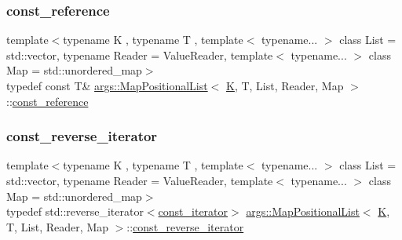 \subsubsection{\texorpdfstring{const\+\_\+reference}{const\_reference}}
{\footnotesize\ttfamily template$<$typename K , typename T , template$<$ typename... $>$ class List = std\+::vector, typename Reader  = Value\+Reader, template$<$ typename... $>$ class Map = std\+::unordered\+\_\+map$>$ \\
typedef const T\& \hyperlink{classargs_1_1_map_positional_list}{args\+::\+Map\+Positional\+List}$<$ \hyperlink{cgal__test_8cpp_a891e241aa245ae63618f03737efba309}{K}, T, List, Reader, Map $>$\+::\hyperlink{classargs_1_1_map_positional_list_a49c2fa40c50f8d1c4f3ef6023761972d}{const\+\_\+reference}}

\mbox{\label{classargs_1_1_map_positional_list_a89cd057f52f097ccd3d3072f62eacd47}} 
\subsubsection{\texorpdfstring{const\+\_\+reverse\+\_\+iterator}{const\_reverse\_iterator}}
{\footnotesize\ttfamily template$<$typename K , typename T , template$<$ typename... $>$ class List = std\+::vector, typename Reader  = Value\+Reader, template$<$ typename... $>$ class Map = std\+::unordered\+\_\+map$>$ \\
typedef std\+::reverse\+\_\+iterator$<$\hyperlink{classargs_1_1_map_positional_list_a0700556b0a067e095ee22edbb18206fc}{const\+\_\+iterator}$>$ \hyperlink{classargs_1_1_map_positional_list}{args\+::\+Map\+Positional\+List}$<$ \hyperlink{cgal__test_8cpp_a891e241aa245ae63618f03737efba309}{K}, T, List, Reader, Map $>$\+::\hyperlink{classargs_1_1_map_positional_list_a89cd057f52f097ccd3d3072f62eacd47}{const\+\_\+reverse\+\_\+iterator}}

\mbox{\label{classargs_1_1_map_positional_list_a60aba0aee19ccedfcfd02074339d0e1c}} 
